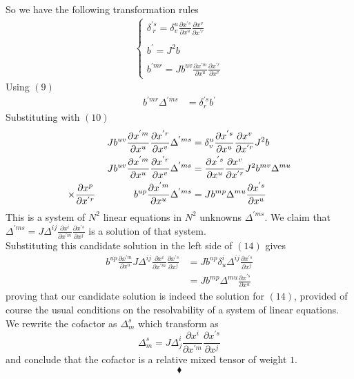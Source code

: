So we have the following transformation rules
\begin{align}
\left\{\begin{array}{l}
\delta^{'s}_{\ r} =  \delta^{u}_v \frac{\partial x^{'s} }{\partial {x^u}}\frac{\partial x^{v} }{\partial x^{'r}}\\\\
b^{'}= J^2 b\\\\
b^{'mr}_{} = J b^{uv}_{}\frac{\partial x^{'m} }{\partial {x^{u}}}\frac{\partial x^{'r} }{\partial x^{v}}
\end{array}\right.
\end{align}
Using $(9)$
\begin{align}
b^{'mr}_{}\Delta^{'ms}&=\delta^{'s}_r b^{'}
\end{align}
Substituting with $(10)$
\begin{align}
Jb^{uv}_{}\frac{\partial x^{'m} }{\partial {x^{u}}}\frac{\partial x^{'r} }{\partial x^{v}}\Delta^{'ms}&=\delta^{u}_v \frac{\partial x^{'s} }{\partial {x^u}}\frac{\partial x^{v} }{\partial x^{'r}} J^2 b\\
Jb^{uv}_{}\frac{\partial x^{'m} }{\partial {x^{u}}}\frac{\partial x^{'r} }{\partial x^{v}}\Delta^{'ms}&=\frac{\partial x^{'s} }{\partial {x^u}}\frac{\partial x^{v} }{\partial x^{'r}} J^2 b^{mv}_{}\Delta^{mu}\\
\times \frac{\partial x^{p} }{\partial x^{'r}}\quad\quad\quad\quad b^{up}_{}\frac{\partial x^{'m} }{\partial {x^{u}}}\Delta^{'ms}&=Jb^{mp}_{}\Delta^{mu}\frac{\partial x^{'s} }{\partial {x^u}}  
\end{align}
This is a system of $N^2$ linear equations in $N^2$ unknowns $\Delta^{'ms}$.  We claim that  $\Delta^{'ms}= J \Delta^{ij}\frac{\partial x^{i} }{\partial {x^{'m}}}\frac{\partial x^{'s} }{\partial x^{j}}$ is a solution of that system.\\
Substituting this candidate solution in the left side of $(14)$ gives
\begin{align*}
b^{up}_{}\frac{\partial x^{'m} }{\partial {x^{u}}}J \Delta^{ij}\frac{\partial x^{i} }{\partial {x^{'m}}}\frac{\partial x^{'s} }{\partial x^{j}}&=Jb^{up}_{}\delta^i_u\Delta^{ij}\frac{\partial x^{'s} }{\partial x^{j}}\\
&=Jb^{mp}\Delta^{mu}\frac{\partial x^{'s} }{\partial {x^u}}  
\end{align*}
proving that our candidate solution is indeed the solution for $(14)$, provided of course the usual conditions on the resolvability of a system of linear equations.\\
We rewrite the cofactor as $\Delta^{s}_{m}$ which transform as $$\Delta^{s}_{m}= J \Delta^{i}_{j}\frac{\partial x^{i} }{\partial {x^{'m}}}\frac{\partial x^{'s} }{\partial x^{j}}$$
and conclude that the cofactor is a relative mixed tensor of weight $1$.
$$\blacklozenge$$
\newpage

